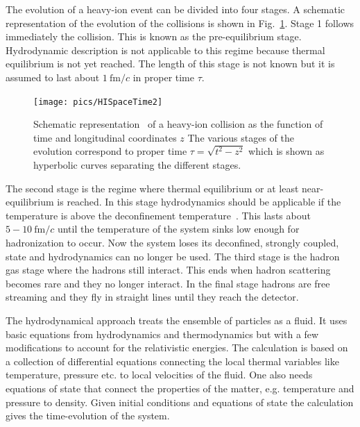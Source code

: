 The evolution of a heavy-ion event can be divided into four stages. A schematic representation of the evolution of the collisions is shown in Fig.~\ref{fig:HISpaceTime}. Stage 1 follows immediately the collision. This is known as the pre-equilibrium stage. Hydrodynamic description is not applicable to this regime because thermal equilibrium is not yet reached. The length of this stage is not known but it is assumed to last about $1\ \mathrm{fm}/c$ in proper time $\tau$. 

\begin{figure}[htb]
\centering
               \texttt{[image: pics/HISpaceTime2]}
        \caption[Schematic representation of a heavy-ion collision]{Schematic representation~\cite{Romatschke:2009im} of a heavy-ion collision as the function of time and longitudinal coordinates $z$ The various stages of the evolution correspond to proper time $\tau=\sqrt{t^2-z^2}$ which is shown as hyperbolic curves separating the different stages.}
        	\label{fig:HISpaceTime}
\end{figure}

The second stage is the regime where thermal equilibrium or at least near-equilibrium is reached. In this stage hydrodynamics should be applicable if the temperature is above the deconfinement temperature~\cite{Romatschke:2009im}. This lasts about $5-10\ \mathrm{fm}/c$ until the temperature of the system sinks low enough for hadronization to occur. Now the system loses its deconfined, strongly coupled, state and hydrodynamics can no longer be used. The third stage is the hadron gas stage where the hadrons still interact. This ends when hadron scattering becomes rare and they no longer interact. In the final stage hadrons are free streaming and they fly in straight lines until they reach the detector.


The hydrodynamical approach treats the ensemble of particles as a fluid. It uses  basic equations from hydrodynamics and thermodynamics but with a few modifications to account for the relativistic energies. The calculation is based on a collection of differential equations connecting the local thermal variables like temperature, pressure etc. to local velocities of the fluid. One also needs equations of state that connect the properties of the matter, e.g. temperature and pressure to density.  Given initial conditions and equations of state the calculation gives the time-evolution of the system.

